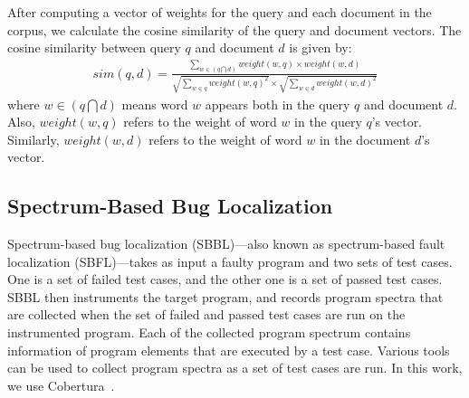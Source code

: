 After computing a vector of weights for the query and each document in the corpus, we calculate the cosine similarity of the query and document vectors. The cosine similarity between query $q$ and document $d$ is given by:
\begin{align}
\label{eqn:cosine_sim}
\mathit{sim}(q,d) = \frac{\sum\limits_{w\in (q\bigcap d)} \mathit{weight}(w,q) \times \mathit{weight}(w,d)}{\sqrt{\sum\limits_{w\in q}\mathit{weight}(w,q)^{2}} \times \sqrt{\sum\limits_{w\in d}\mathit{weight}(w,d)^{2}}}
\end{align}
where $w\in (q\bigcap d)$ means word $w$ appears both in the query $q$ and document $d$. Also, $\mathit{weight}(w,q)$ refers to the weight of word $w$ in the query $q$'s vector. Similarly, $\mathit{weight}(w,d)$ refers to the weight of word $w$ in the document $d$'s vector.

%


\subsection{Spectrum-Based Bug Localization} 
\label{sec.spectrum-based}

Spectrum-based bug localization (SBBL)---also known as spectrum-based fault localization (SBFL)---takes as input a faulty program and two sets of test cases. One is a set of failed test cases, and the other one is a set of passed test cases. SBBL then instruments the target program, and records program spectra that are collected when the set of failed and passed test cases are run on the instrumented program. Each of the collected program spectrum contains information of program elements that are executed by a test case. Various tools can be used to collect program spectra as a set of test cases are run. In this work, we use Cobertura~\cite{cobertura_link}.

